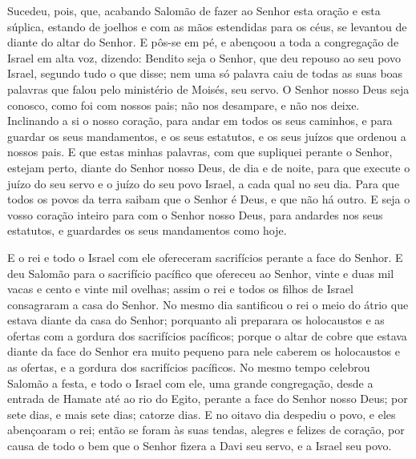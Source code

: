 Sucedeu, pois, que, acabando Salomão de fazer ao Senhor esta
oração e esta súplica, estando de joelhos e com as mãos estendidas
para os céus, se levantou de diante do altar do Senhor. E
pôs-se em pé, e abençoou a toda a congregação de Israel em alta voz,
dizendo: Bendito seja o Senhor, que deu repouso ao seu povo
Israel, segundo tudo o que disse; nem uma só palavra caiu de todas
as suas boas palavras que falou pelo ministério de Moisés, seu
servo. O Senhor nosso Deus seja conosco, como foi com nossos
pais; não nos desampare, e não nos deixe. Inclinando a si o
nosso coração, para andar em todos os seus caminhos, e para guardar
os seus mandamentos, e os seus estatutos, e os seus juízos que
ordenou a nossos pais. E que estas minhas palavras, com que
supliquei perante o Senhor, estejam perto, diante do Senhor nosso
Deus, de dia e de noite, para que execute o juízo do seu servo e o
juízo do seu povo Israel, a cada qual no seu dia. Para que
todos os povos da terra saibam que o Senhor é Deus, e que não há
outro. E seja o vosso coração inteiro para com o Senhor nosso
Deus, para andardes nos seus estatutos, e guardardes os seus
mandamentos como hoje.

E o rei e todo o Israel com ele ofereceram sacrifícios perante a
face do Senhor. E deu Salomão para o sacrifício pacífico que
ofereceu ao Senhor, vinte e duas mil vacas e cento e vinte mil
ovelhas; assim o rei e todos os filhos de Israel consagraram a casa
do Senhor. No mesmo dia santificou o rei o meio do átrio que
estava diante da casa do Senhor; porquanto ali preparara os
holocaustos e as ofertas com a gordura dos sacrifícios pacíficos;
porque o altar de cobre que estava diante da face do Senhor era
muito pequeno para nele caberem os holocaustos e as ofertas, e a
gordura dos sacrifícios pacíficos. No mesmo tempo celebrou
Salomão a festa, e todo o Israel com ele, uma grande congregação,
desde a entrada de Hamate até ao rio do Egito, perante a face do
Senhor nosso Deus; por sete dias, e mais sete dias; catorze dias.
E no oitavo dia despediu o povo, e eles abençoaram o rei;
então se foram às suas tendas, alegres e felizes de coração, por
causa de todo o bem que o Senhor fizera a Davi seu servo, e a Israel
seu povo.

\medskip

